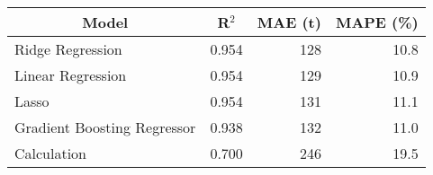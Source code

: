 
\begin{tabular}[t]{lrrr}
\toprule
\multicolumn{1}{c}{Model} & \multicolumn{1}{c}{R$^2$} & \multicolumn{1}{c}{MAE (t)} & \multicolumn{1}{c}{MAPE (\%)}\\
\midrule
Ridge Regression & 0.954 & 128 & 10.8\\
Linear Regression & 0.954 & 129 & 10.9\\
Lasso & 0.954 & 131 & 11.1\\
Gradient Boosting Regressor & 0.938 & 132 & 11.0\\
Calculation & 0.700 & 246 & 19.5\\
\bottomrule
\end{tabular}
